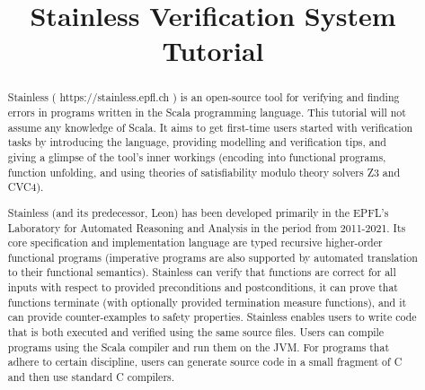 \documentclass{fmcad}
\begin{document}
\title{Stainless Verification System Tutorial}
\author{
\and
}

\maketitle

\begin{abstract}
  Stainless ( https://stainless.epfl.ch ) is an open-source tool for
  verifying and finding errors in programs written in the
  Scala programming language. This tutorial will not assume
  any knowledge of Scala. It aims to get first-time users
  started with verification tasks by introducing the
  language, providing modelling and verification tips, and
  giving a glimpse of the tool's inner workings (encoding
  into functional programs, function unfolding, and using
  theories of satisfiability modulo theory solvers Z3 and
  CVC4).

  Stainless (and its predecessor, Leon) has been developed
  primarily in the EPFL's Laboratory for Automated Reasoning
  and Analysis in the period from 2011-2021. Its core
  specification and implementation language are typed
  recursive higher-order functional programs (imperative
  programs are also supported by automated translation to
  their functional semantics).  Stainless can verify that
  functions are correct for all inputs with respect to
  provided preconditions and postconditions, it can prove
  that functions terminate (with optionally provided
  termination measure functions), and it can provide
  counter-examples to safety properties.  Stainless enables
  users to write code that is both executed and verified
  using the same source files. Users can compile programs
  using the Scala compiler and run them on the JVM. For
  programs that adhere to certain discipline, users can
  generate source code in a small fragment of C and then
  use standard C compilers.
\end{abstract}
\end{document}
